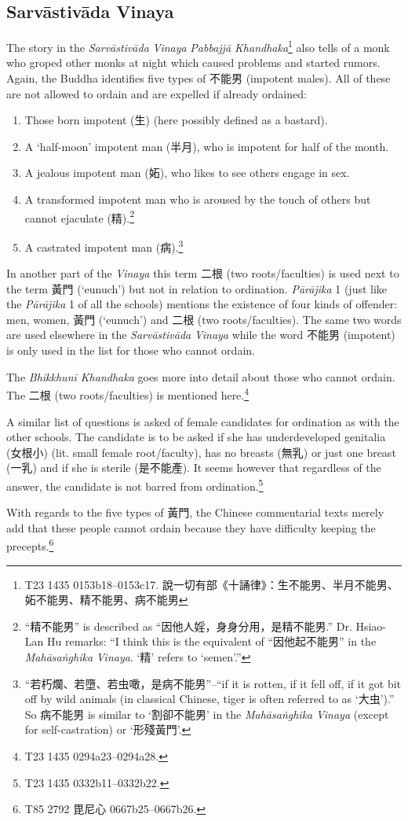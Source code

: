 \subsection{Sarvāstivāda Vinaya}
The story in the {\em Sarvāstivāda} {\em Vinaya} {\em Pabbajjā Khandhaka}\footnote{T23 1435 0153b18–0153c17. 說一切有部《十誦律》：生不能男、半月不能男、妬不能男、精不能男、病不能男} also tells of a monk who groped other monks at night which caused problems and started rumors. Again, the Buddha identifies five types of 不能男 (impotent males). All of these are not allowed to ordain and are expelled if already ordained:

\begin{enumerate}
\item Those born impotent (生) (here possibly defined as a bastard).
\item A `half-moon' impotent man (半月), who is impotent for half of the month.
\item A jealous impotent man (妬), who likes to see others engage in sex.
\item A transformed impotent man who is aroused by the touch of others but cannot ejaculate (精).\footnote{``精不能男'' is described as ``因他人婬，身身分用，是精不能男.'' Dr. Hsiao-Lan Hu remarks: ``I think this is the equivalent of ``因他起不能男'' in the {\em Mahāsaṅghika} {\em Vinaya}. `精' refers to `semen'.''}
\item A castrated impotent man (病).\footnote{``若朽爛、若墮、若虫噉，是病不能男''--``if it is rotten, if it fell off, if it got bit off by wild animals (in classical Chinese, tiger is often referred to as `大虫').'' So 病不能男 is similar to `割卻不能男' in the {\em Mahāsaṅghika} {\em Vinaya} (except for self-castration) or `形殘黃門'.}
\end{enumerate}

In another part of the {\em Vinaya} this term 二根 (two roots/faculties) is used next to the term 黃門 (`eunuch') but not in relation to ordination. {\em Pārājika} 1 (just like the {\em Pārājika} 1 of all the schools) mentions the existence of four kinds of offender: men, women, 黃門 (`eunuch') and 二根 (two roots/faculties). The same two words are used elsewhere in the {\em Sarvāstivāda} {\em Vinaya} while the word 不能男 (impotent) is only used in the list for those who cannot ordain.

The {\em Bhikkhunī Khandhaka} goes more into detail about those who cannot ordain. The 二根 (two roots/faculties) is mentioned here.\footnote{T23 1435 0294a23–0294a28.} 

A similar list of questions is asked of female candidates for ordination as with the other schools. The candidate is to be asked if she has underdeveloped genitalia (女根小) (lit. small female root/faculty), has no breasts (無乳) or just one breast (一乳) and if she is sterile (是不能產). It seems however that regardless of the answer, the candidate is not barred from ordination.\footnote{T23 1435 0332b11–0332b22.}

With regards to the five types of 黃門, the Chinese commentarial texts merely add that these people cannot ordain because they have difficulty keeping the precepts.\footnote{T85 2792 毘尼心 0667b25–0667b26.}

